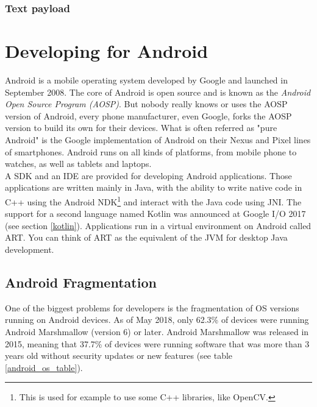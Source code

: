 \documentclass[11pt,a4paper]{report}
\begin{document}
\subsection{Text payload}




\chapter{Developing for Android}
\label{android_chapter}
Android is a mobile operating system developed by Google and launched in September 2008. The core of Android is open source and is known as the \emph{Android Open Source Program (AOSP)}. But nobody really knows or uses the AOSP version of Android, every phone manufacturer, even Google, forks the AOSP version to build its own for their devices. What is often referred as "pure Android" is the Google implementation of Android on their Nexus and Pixel lines of smartphones. Android runs on all kinds of platforms, from mobile phone to watches, as well as tablets and laptops. \\

A SDK and an IDE are provided for developing Android applications. Those applications are written mainly in Java, with the ability to write native code in C++ using the Android NDK\footnote{This is used for example to use some C++ libraries, like OpenCV.} and interact with the Java code using JNI. The support for a second language named Kotlin was announced at Google I/O 2017 (see section \ref{kotlin}). Applications run in a virtual environment on Android called ART. You can think of ART as the equivalent of the JVM for desktop Java development.
\section{Android Fragmentation}
One of the biggest problems for developers is the fragmentation of OS versions running on Android devices. As of May 2018, only 62.3\% of devices were running Android Marshmallow (version 6) or later. Android Marshmallow was released in 2015, meaning that 37.7\% of devices were running software that was more than 3 years old without security updates or new features (see table \ref{android_os_table}).
\end{document}
